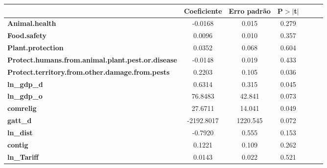 \begin{center}
\begin{tabular}{lcccccc}
                                                          & \textbf{Coeficiente} & \textbf{Erro padrão} &\textbf{P$> |$t$|$}\\
\midrule
\textbf{Animal.health}                                    &      -0.0168  &        0.015     &        0.279 \\
\textbf{Food.safety}                                      &       0.0096  &        0.010     &        0.357 \\
\textbf{Plant.protection}                                 &       0.0352  &        0.068     &        0.604 \\
\textbf{Protect.humans.from.animal.plant.pest.or.disease} &      -0.0148  &        0.019     &        0.433 \\
\textbf{Protect.territory.from.other.damage.from.pests}   &       0.2203  &        0.105     &        0.036 \\
\textbf{ln\_gdp\_d}                                       &       0.6314  &        0.315     &        0.045 \\
\textbf{ln\_gdp\_o}                                       &      76.8483  &       42.841     &        0.073 \\
\textbf{comrelig}                                         &      27.6711  &       14.041     &        0.049 \\
\textbf{gatt\_d}                                          &   -2192.8017  &     1220.545     &        0.072 \\
\textbf{ln\_dist}                                         &      -0.7920  &        0.555     &        0.153 \\
\textbf{contig}                                           &       0.1221  &        0.109     &        0.262 \\
\textbf{ln\_Tariff}                                       &       0.0143  &        0.022     &        0.521 \\
\bottomrule
\end{tabular}
\end{center}